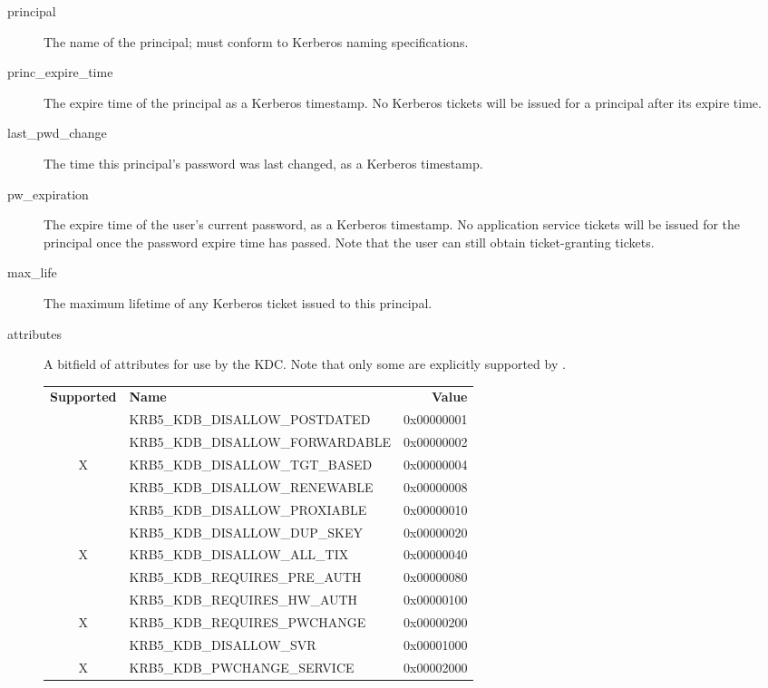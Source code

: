 \begin{description}
\item[principal] The name of the principal; must conform to Kerberos
naming specifications.

\item[princ_expire_time] The expire time of the principal as a Kerberos
timestamp.  No Kerberos tickets will be issued for a principal after
its expire time.

\item[last_pwd_change] The time this principal's password was last
changed, as a Kerberos timestamp.

\item[pw_expiration] The expire time of the user's current password, as a
Kerberos timestamp.  No application service tickets will be issued for the
principal once the password expire time has passed.  Note that the
user can still obtain ticket-granting tickets.

\item[max_life] The maximum lifetime of any Kerberos ticket issued to
this principal.

\item[attributes] A bitfield of attributes for use by the KDC.  
Note that only some are explicitly supported by \secure{}.

\begin{tabular}{clr}
{\bf Supported} & {\bf Name} & {\bf Value} \\
  & KRB5_KDB_DISALLOW_POSTDATED     & 0x00000001 \\
  & KRB5_KDB_DISALLOW_FORWARDABLE   & 0x00000002 \\
X & KRB5_KDB_DISALLOW_TGT_BASED     & 0x00000004 \\
  & KRB5_KDB_DISALLOW_RENEWABLE     & 0x00000008 \\
  & KRB5_KDB_DISALLOW_PROXIABLE     & 0x00000010 \\
  & KRB5_KDB_DISALLOW_DUP_SKEY      & 0x00000020 \\
X & KRB5_KDB_DISALLOW_ALL_TIX       & 0x00000040 \\
  & KRB5_KDB_REQUIRES_PRE_AUTH      & 0x00000080 \\
  & KRB5_KDB_REQUIRES_HW_AUTH       & 0x00000100 \\
X & KRB5_KDB_REQUIRES_PWCHANGE      & 0x00000200 \\
  & KRB5_KDB_DISALLOW_SVR           & 0x00001000 \\
X & KRB5_KDB_PWCHANGE_SERVICE       & 0x00002000
\end{tabular}


\end{description}
